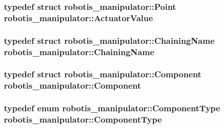 \subsubsection[{\texorpdfstring{Actuator\+Value}{ActuatorValue}}]{\setlength{\rightskip}{0pt plus 5cm}typedef struct {\bf robotis\+\_\+manipulator\+::\+Point}  {\bf robotis\+\_\+manipulator\+::\+Actuator\+Value}}\hypertarget{namespacerobotis__manipulator_a26f478d98222f9ce1bf66c7df248037b}{}\label{namespacerobotis__manipulator_a26f478d98222f9ce1bf66c7df248037b}
\subsubsection[{\texorpdfstring{Chaining\+Name}{ChainingName}}]{\setlength{\rightskip}{0pt plus 5cm}typedef struct {\bf robotis\+\_\+manipulator\+::\+Chaining\+Name}  {\bf robotis\+\_\+manipulator\+::\+Chaining\+Name}}\hypertarget{namespacerobotis__manipulator_a9b57e9a97855a185ca26900482155cdd}{}\label{namespacerobotis__manipulator_a9b57e9a97855a185ca26900482155cdd}
\subsubsection[{\texorpdfstring{Component}{Component}}]{\setlength{\rightskip}{0pt plus 5cm}typedef struct {\bf robotis\+\_\+manipulator\+::\+Component}  {\bf robotis\+\_\+manipulator\+::\+Component}}\hypertarget{namespacerobotis__manipulator_a66033834ce02ad7b8dec1a7228852657}{}\label{namespacerobotis__manipulator_a66033834ce02ad7b8dec1a7228852657}
\subsubsection[{\texorpdfstring{Component\+Type}{ComponentType}}]{\setlength{\rightskip}{0pt plus 5cm}typedef enum {\bf robotis\+\_\+manipulator\+::\+Component\+Type}  {\bf robotis\+\_\+manipulator\+::\+Component\+Type}}\hypertarget{namespacerobotis__manipulator_a0074428cb994a4539fa1c1950d19db4c}{}\label{namespacerobotis__manipulator_a0074428cb994a4539fa1c1950d19db4c}
